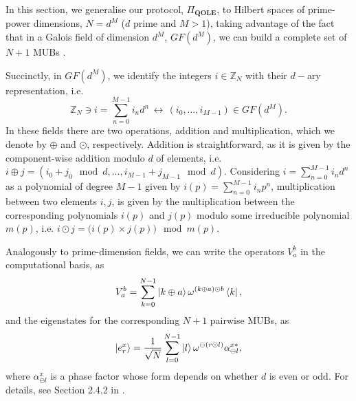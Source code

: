 In this section, we generalise our protocol, $\Pi_{\textbf{QOLE}}$, to Hilbert spaces of prime-power dimensions, $N=d^M$ ($d$ prime and $M>1$), taking advantage  of the fact that in a Galois field of dimension $d^M$, $GF(d^M)$, we can build a complete set of $N + 1$ MUBs \cite{DEBZ10}.

Succinctly, in $GF(d^M)$, we identify the integers $i\in\mathbb{Z}_N$ with their $d-$ary representation, i.e.
$$\mathbb{Z}_N \ni i = \sum^{M-1}_{n=0} i_n d^n \, \longleftrightarrow \, (i_0, \dots , i_{M-1}) \in GF(d^M).$$
In these fields there are  two operations, addition and multiplication, which we denote by $\oplus$ and $\odot$, respectively. Addition  is straightforward, as it is given by the component-wise addition modulo $d$ of elements, i.e. $i\oplus j = (i_0 + j_0 \mod d, \dots , i_{M-1} + j_{M-1} \mod d)$.  Considering $i = \sum^{M-1}_{n=0} i_n d^n $ as a polynomial of degree $M-1$ given by $i(p) = \sum^{M-1}_{n=0} i_n p^n$,  multiplication between two elements $i, j$, is given by the multiplication between the corresponding polynomials $i(p)$ and $j(p)$ modulo some irreducible polynomial $m(p)$, i.e. $i\odot j = \big(i(p)\times j(p)\big) \mod m(p)$. 

Analogously to prime-dimension fields, we can write the operators $V_a^b$ in the computational basis, as  \begin{equation*}
    V^b_a = \sum_{k=0}^{N-1} \ket{k \oplus a} \omega^{(k \oplus a)\odot b} \bra{k},
\end{equation*}
and the eigenstates for the corresponding $N+1$ pairwise MUBs, as 
\begin{equation*}
    \ket{e^x_r} = \frac{1}{\sqrt{N}} \sum_{l=0}^{N-1}\ket{l} \omega^{\ominus(r \odot l)} \alpha^{x*}_{\ominus l},
\end{equation*}
where $\alpha^{x}_{\ominus l}$ is a phase factor whose form depends on whether $d$ is even or odd. For details, see Section 2.4.2 in \cite{DEBZ10}.

